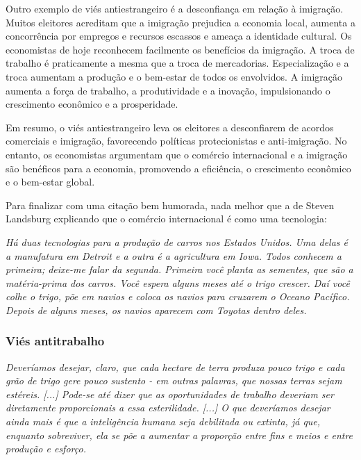 Outro exemplo de viés antiestrangeiro é a desconfiança em relação à imigração. Muitos eleitores acreditam que a imigração prejudica a economia local, aumenta a concorrência por empregos e recursos escassos e ameaça a identidade cultural. Os economistas de hoje reconhecem facilmente os benefícios da imigração. A troca de trabalho é praticamente a mesma que a troca de mercadorias. Especialização e a troca aumentam a produção e o bem-estar de todos os envolvidos. A imigração aumenta a força de trabalho, a produtividade e a inovação, impulsionando o crescimento econômico e a prosperidade.

Em resumo, o viés antiestrangeiro leva os eleitores a desconfiarem de acordos comerciais e imigração, favorecendo políticas protecionistas e anti-imigração. No entanto, os economistas argumentam que o comércio internacional e a imigração são benéficos para a economia, promovendo a eficiência, o crescimento econômico e o bem-estar global.

Para finalizar com uma citação bem humorada, nada melhor que a de Steven Landsburg explicando que o comércio internacional é como uma tecnologia:

\begin{citacao}
    \textit{
        Há duas tecnologias para a produção de carros nos Estados Unidos. Uma delas é a manufatura em Detroit e a outra é a agricultura em Iowa. Todos conhecem a primeira; deixe-me falar da segunda. Primeira você planta as sementes, que são a matéria-prima dos carros. Você espera alguns meses até o trigo crescer. Daí você colhe o trigo, põe em navios e coloca os navios para cruzarem o Oceano Pacífico. Depois de alguns meses, os navios aparecem com Toyotas dentro deles.
    } \newline
    \cite{landsburg2012armchair}
\end{citacao}


\subsubsection{Viés antitrabalho}

\begin{citacao}
    \textit{
        Deveríamos desejar, claro, que cada hectare de terra produza pouco trigo e cada grão de trigo gere pouco sustento - em outras palavras, que nossas terras sejam estéreis. [...] Pode-se até dizer que as oportunidades de trabalho deveriam ser diretamente proporcionais a essa esterilidade. [...] O que deveríamos desejar ainda mais é que a inteligência humana seja debilitada ou extinta, já que, enquanto sobreviver, ela se põe a aumentar a proporção entre fins e meios e entre produção e esforço.
    } \newline
    \cite{bastiat1859sofismas}
\end{citacao}


